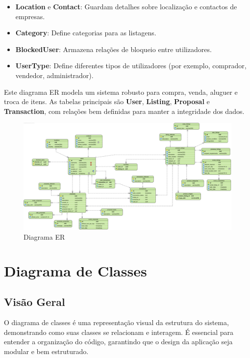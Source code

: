 \documentclass[a4paper, 12pt]{article} %
\begin{document}
\begin{itemize}
    \item \textbf{Location} e \textbf{Contact}: Guardam detalhes sobre localização e contactos de empresas.
    \item \textbf{Category}: Define categorias para as listagens.
    \item \textbf{BlockedUser}: Armazena relações de bloqueio entre utilizadores.
    \item \textbf{UserType}: Define diferentes tipos de utilizadores (por exemplo, comprador, vendedor, administrador).
\end{itemize}

Este diagrama ER modela um sistema robusto para compra, venda, aluguer e troca de itens. As tabelas principais são \textbf{User}, \textbf{Listing}, \textbf{Proposal} e \textbf{Transaction}, com relações bem definidas para manter a integridade dos dados.


\begin{figure}[ht]
	\centering
	\includegraphics[width=\textwidth]{../images/entity-relationship-diagram.png}
	\caption{Diagrama ER}
	\label{fig:diagrama_er}
\end{figure}


\newpage
\section{Diagrama de Classes}

\subsection{Visão Geral}  

O diagrama de classes é uma representação visual da estrutura do sistema, demonstrando como suas classes se relacionam e interagem. É essencial para entender a organização do código, garantindo que o design da aplicação seja modular e bem estruturado.
\end{document}
